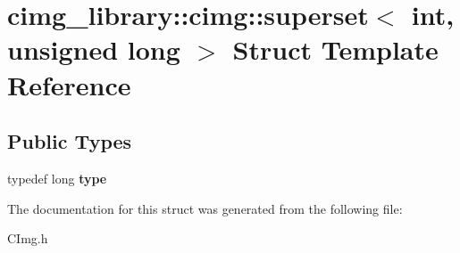 \hypertarget{structcimg__library_1_1cimg_1_1superset_3_01int_00_01unsigned_01long_01_4}{\section{cimg\-\_\-library\-:\-:cimg\-:\-:superset$<$ int, unsigned long $>$ Struct Template Reference}
\label{structcimg__library_1_1cimg_1_1superset_3_01int_00_01unsigned_01long_01_4}
}
\subsection*{Public Types}
\begin{DoxyCompactItemize}
\item 
\hypertarget{structcimg__library_1_1cimg_1_1superset_3_01int_00_01unsigned_01long_01_4_a2f2a634bd552a7ab78d0f592618c1e28}{typedef long {\bfseries type}}\label{structcimg__library_1_1cimg_1_1superset_3_01int_00_01unsigned_01long_01_4_a2f2a634bd552a7ab78d0f592618c1e28}

\end{DoxyCompactItemize}


The documentation for this struct was generated from the following file\-:\begin{DoxyCompactItemize}
\item 
C\-Img.\-h\end{DoxyCompactItemize}
